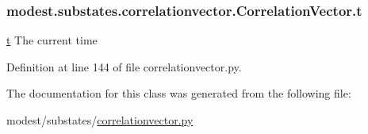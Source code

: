\subsubsection[{\texorpdfstring{t}{t}}]{\setlength{\rightskip}{0pt plus 5cm}modest.\+substates.\+correlationvector.\+Correlation\+Vector.\+t}\hypertarget{classmodest_1_1substates_1_1correlationvector_1_1CorrelationVector_a127ca6c8eed6a2e822dbac7e83458bf3}{}\label{classmodest_1_1substates_1_1correlationvector_1_1CorrelationVector_a127ca6c8eed6a2e822dbac7e83458bf3}


\hyperlink{classmodest_1_1substates_1_1correlationvector_1_1CorrelationVector_a127ca6c8eed6a2e822dbac7e83458bf3}{t} The current time 



Definition at line 144 of file correlationvector.\+py.



The documentation for this class was generated from the following file\+:\begin{DoxyCompactItemize}
\item 
modest/substates/\hyperlink{correlationvector_8py}{correlationvector.\+py}\end{DoxyCompactItemize}
